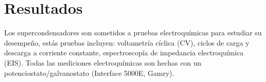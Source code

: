 \section{Resultados}
Los supercondensadores son sometidos a pruebas electroquímicas para estudiar su desempeño, estás pruebas incluyen: voltametría cíclica (CV), ciclos de carga y descarga a corriente constante, espectroscopía de impedancia electroquímica (EIS). Todas las mediciones electroquímicas son hechas con un potenciostato/galvanostato (Interface 5000E, Gamry).
